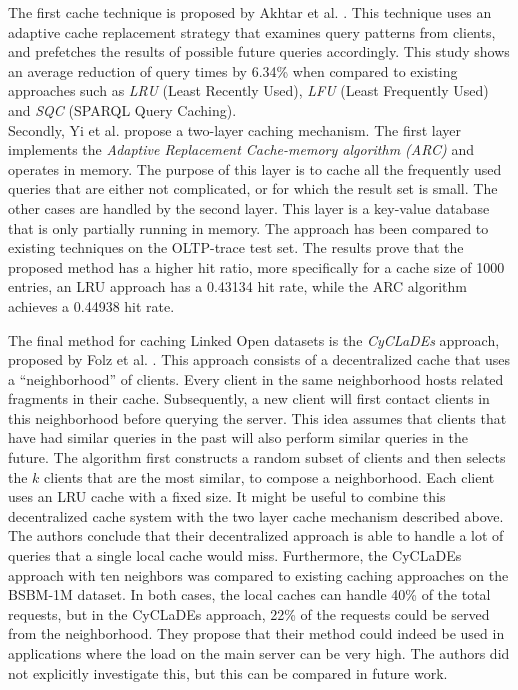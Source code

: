 \noindent The first cache technique is proposed by Akhtar et al. \cite{ISI:000532866000001}. This technique uses an adaptive cache replacement strategy that examines query patterns from clients, and prefetches the results of possible future queries accordingly. This study shows an average reduction of query times by 6.34\% when compared to existing approaches such as \emph{LRU} (Least Recently Used), \emph{LFU} (Least Frequently Used) and \emph{SQC} (SPARQL Query Caching).\\

\noindent Secondly, Yi et al. \cite{ISI:000349634200003} propose a two-layer caching mechanism. The first layer implements the \emph{Adaptive Replacement Cache-memory algorithm (ARC)} and operates in memory. The purpose of this layer is to cache all the frequently used queries that are either not complicated, or for which the result set is small. The other cases are handled by the second layer. This layer is a key-value database that is only partially running in memory. The approach has been compared to existing techniques on the OLTP-trace test set. The results prove that the proposed method has a higher hit ratio, more specifically for a cache size of 1000 entries, an LRU approach has a 0.43134 hit rate, while the ARC algorithm achieves a 0.44938 hit rate.

The final method for caching Linked Open datasets is the \emph{CyCLaDEs} approach, proposed by Folz et al. \cite{Folz2015CyCLaDEsAD}. This approach consists of a decentralized cache that uses a ``neighborhood'' of clients. Every client in the same neighborhood hosts related fragments in their cache. Subsequently, a new client will first contact clients in this neighborhood before querying the server. This idea assumes that clients that have had similar queries in the past will also perform similar queries in the future. The algorithm first constructs a random subset of clients and then selects the $k$ clients that are the most similar, to compose a neighborhood. Each client uses an LRU cache with a fixed size. It might be useful to combine this decentralized cache system with the two layer cache mechanism described above. The authors conclude that their decentralized approach is able to handle a lot of queries that a single local cache would miss. Furthermore, the CyCLaDEs approach with ten neighbors was compared to existing caching approaches on the BSBM-1M dataset. In both cases, the local caches can handle 40\% of the total requests, but in the CyCLaDEs approach, 22\% of the requests could be served from the neighborhood. They propose that their method could indeed be used in applications where the load on the main server can be very high. The authors did not explicitly investigate this, but this can be compared in future work.

